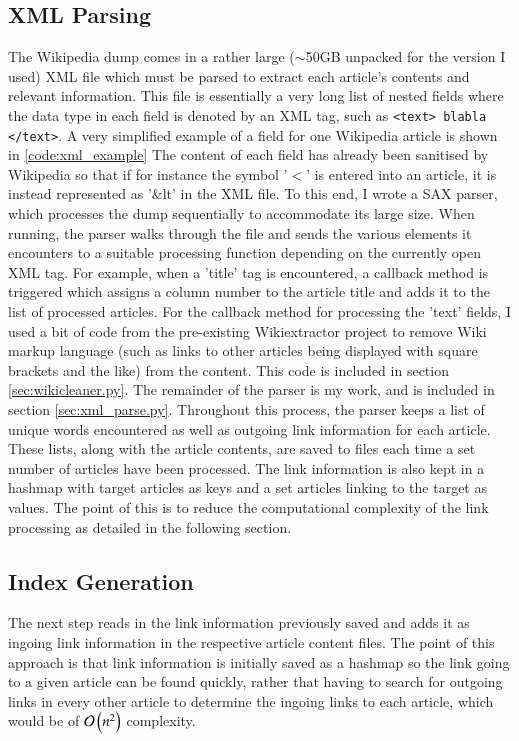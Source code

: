 \subsection{XML Parsing}
The Wikipedia dump comes in a rather large ($\sim$50GB unpacked for the version I used) XML file which must be parsed to extract each article's contents and relevant information. This file is essentially a very long list of nested fields where the data type in each field is denoted by an XML tag, such as \verb+<text> blabla </text>+. A very simplified example of a field for one Wikipedia article is shown in \ref{code:xml_example}
%
%
%
The content of each field has already been sanitised by Wikipedia so that if for instance the symbol '$<$' is entered into an article, it is instead represented as '\&lt' in the XML file.
To this end, I wrote a SAX parser, which processes the dump sequentially to accommodate its large size. When running, the parser walks through the file and sends the various elements it encounters to a suitable processing function depending on the currently open XML tag. For example, when a 'title' tag is encountered, a callback method is triggered which assigns a column number to the article title and adds it to the list of processed articles. For the callback method for processing the 'text' fields, I used a bit of code from the pre-existing Wikiextractor project to remove Wiki markup language (such as links to other articles being displayed with square brackets and the like) from the content. This code is included in section \ref{sec:wikicleaner.py}. The remainder of the parser is my work, and is included in section \ref{sec:xml_parse.py}. Throughout this process, the parser keeps a list of unique words encountered as well as outgoing link information for each article. These lists, along with the article contents, are saved to files each time a set number of articles have been processed. The link information is also kept in a hashmap with target articles as keys and a set articles linking to the target as values. The point of this is to reduce the computational complexity of the link processing as detailed in the following section.

\subsection{Index Generation}
The next step reads in the link information previously saved and adds it as ingoing link information in the respective article content files. The point of this approach is that link information is initially saved as a hashmap so the link going to a given article can be found quickly, rather that having to search for outgoing links in every other article to determine the ingoing links to each article, which would be of $\mathcal{O}\left( n^2 \right)$ complexity.

